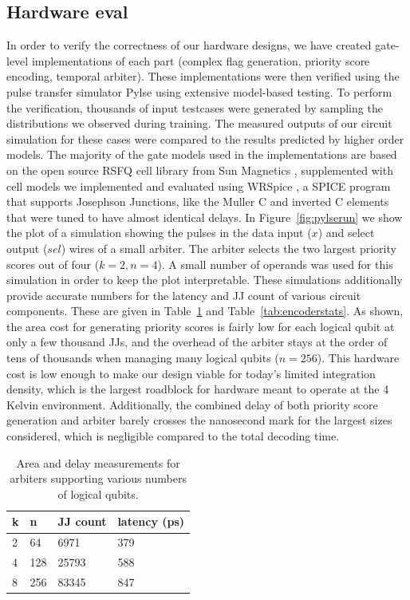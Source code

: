 \subsection{Hardware eval}
In order to verify the correctness of our hardware designs, we have created gate-level implementations of each part (complex flag generation, priority score encoding, temporal arbiter).
These implementations were then verified using the pulse transfer simulator Pylse \cite{pylse} using extensive model-based testing.
To perform the verification, thousands of input testcases were generated by sampling the distributions we observed during training.
The measured outputs of our circuit simulation for these cases were compared to the results predicted by higher order models.
The majority of the gate models used in the implementations are based on the open source RSFQ cell library from Sun Magnetics \cite{rsfqlib}, supplemented with cell models we implemented and evaluated using WRSpice \cite{wrspice}, a SPICE program that supports Josephson Junctions, like the Muller C and inverted C elements that were tuned to have almost identical delays.
In Figure~\ref{fig:pylserun} we show the plot of a simulation showing the pulses in the data input ($x$) and select output ($sel$) wires of a small arbiter.
The arbiter selects the two largest priority scores out of four ($k=2,n=4$).
A small number of operands was used for this simulation in order to keep the plot interpretable.
These simulations additionally provide accurate numbers for the latency and JJ count of various circuit components.
These are given in Table~\ref{tab:arbstats} and Table~\ref{tab:encoderstats}.
As shown, the area cost for generating priority scores is fairly low for each logical qubit at only a few thousand JJs, and the overhead of the arbiter stays at the order of tens of thousands when managing many logical qubits ($n=256$).
This hardware cost is low enough to make our design viable for today's limited integration density, which is the largest roadblock for hardware meant to operate at the 4 Kelvin environment.
Additionally, the combined delay of both priority score generation and arbiter barely crosses the nanosecond mark for the largest sizes considered, which is negligible compared to the total decoding time.



\begin{table}[]
\caption{Area and delay measurements for arbiters supporting various numbers of logical qubits.}
\label{tab:arbstats}
\begin{tabular}{|l|l|l|l|}
\hline
k & n   & JJ count & latency (ps) \\ \hline
2 & 64  & 6971     & 379          \\ \hline
4 & 128 & 25793    & 588          \\ \hline
8 & 256 & 83345    & 847          \\ \hline
\end{tabular}
\end{table}

